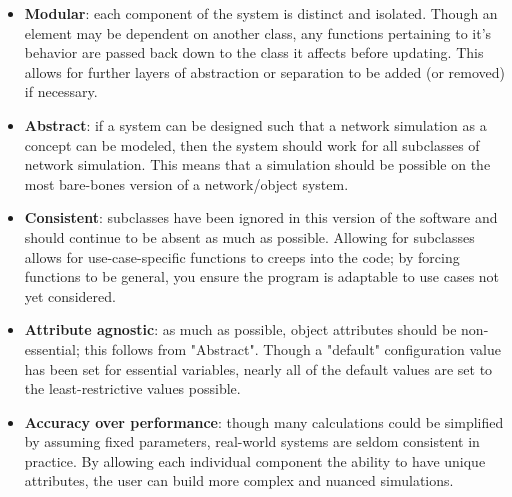\begin{itemize}
  \item \textbf{Modular}:  each component of the system is distinct and isolated.  Though an element may be dependent on another class, any functions pertaining to it's behavior are passed back down to the class it affects before updating.  This allows for further layers of abstraction or separation to be added (or removed) if necessary.
  \item \textbf{Abstract}:  if a system can be designed such that a network simulation as a concept can be modeled, then the system should work for all subclasses of network simulation.  This means that a simulation should be possible on the most bare-bones version of a network/object system.
  \item  \textbf{Consistent}:  subclasses have been ignored in this version of the software and should continue to be absent as much as possible.  Allowing for subclasses allows for use-case-specific functions to creeps into the code; by forcing functions to be general, you ensure the program is adaptable to use cases not yet considered.
  \item \textbf{Attribute agnostic}:  as much as possible, object attributes should be non-essential; this follows from "Abstract".  Though a "default" configuration value has been set for essential variables, nearly all of the default values are set to the least-restrictive values possible.
  \item \textbf{Accuracy over performance}:  though many calculations could be simplified by assuming fixed parameters, real-world systems are seldom consistent in practice.  By allowing each individual component the ability to have unique attributes, the user can build more complex and nuanced simulations.
\end{itemize}



